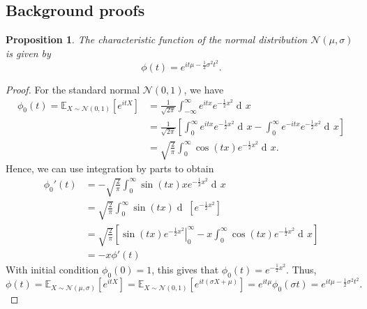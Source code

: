 \documentclass{article}
\newtheorem{proposition}[theorem]{Proposition}
\newcommand{\dd}{\mathop{\mathrm{d}\!}}
\newcommand{\E}{\mathbb{E}}
\newcommand{\N}{\mathcal{N}}
\begin{document}
\subsection{Background proofs}
\begin{proposition}
    The characteristic function of the normal distribution $\N(\mu,\sigma)$ is given by
    \begin{equation*}
        \phi(t) = e^{it\mu - \frac{1}{2}\sigma^2t^2}.
    \end{equation*}
\end{proposition}
\begin{proof}
    For the standard normal $\N(0,1)$, we have
    \begin{align*}
        \phi_0(t) = \E_{X \sim \N(0,1)}[e^{itX}] &= \frac{1}{\sqrt{2\pi}} \int_{-\infty}^\infty e^{itx} e^{-\frac{1}{2}x^2} \dd x\\
        &= \frac{1}{\sqrt{2\pi}} \left[ \int_{0}^\infty e^{itx} e^{-\frac{1}{2}x^2} \dd x - \int_{0}^\infty e^{-itx} e^{-\frac{1}{2}x^2} \dd x \right]\\
        &= \sqrt{\frac{2}{\pi}} \int_{0}^\infty \cos(tx) e^{-\frac{1}{2}x^2} \dd x.
    \end{align*}
    Hence, we can use integration by parts to obtain
    \begin{align*}
        \phi_0'(t) &= -\sqrt{\frac{2}{\pi}} \int_0^\infty \sin(tx)xe^{-\frac{1}{2}x^2} \dd x\\
        &= \sqrt{\frac{2}{\pi}} \int_0^\infty \sin(tx) \dd \,[e^{-\frac{1}{2}x^2}]\\
        &= \sqrt{\frac{2}{\pi}} \left[\left.\sin(tx)e^{-\frac{1}{2}x^2}\right|_0^{\infty} - x \int_0^\infty \cos(tx) e^{-\frac{1}{2}x^2} \dd x\right]\\
        &= -x \phi'(t)
    \end{align*}
    With initial condition $\phi_0(0) = 1$, this gives that $\phi_0(t) = e^{-\frac{1}{2}x^2}$. Thus,
    \begin{equation*}
        \phi(t) = \E_{X \sim \N(\mu,\sigma)}[e^{itX}] = \E_{X \sim \N(0,1)}[e^{it(\sigma X + \mu)}] = e^{it\mu} \phi_0(\sigma t) = e^{it\mu - \frac{1}{2}\sigma^2t^2}.
    \end{equation*}
\end{proof}
\end{document}
